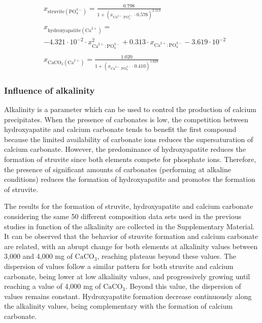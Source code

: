 \begin{refsection}[referencesCh3]
\begin{align}
&x_{\text{struvite} \left(\text{PO}_{4}^{3-}\right) }= \frac{0.798}{1+\left(x_{\text{Ca}^{2+}:\text{PO}_{4}^{3-}} \cdot 0.576\right)^{2.113}} \label{eq:sigmoidal_Ca_StrYield} \\
\nonumber \\
& x_{\text{hydroxyapatite} \left(\text{Ca}^{2+}\right)} = \label{eq:sigmoidal_Ca_HAP} \\
& -4.321 \cdot 10^{-2} \cdot x_{\text{Ca}^{2+}:\text{PO}_{4}^{3-}}^{2} + 0.313 \cdot x_{\text{Ca}^{2+}:\text{PO}_{4}^{3-}} - 3.619 \cdot 10^{-2} \nonumber 
\\
\nonumber \\
&  x_{\text{CaCO}_{3} \left(\text{Ca}^{2+}\right)} = \frac{1.020}{1+\left(x_{\text{Ca}^{2+}:\text{PO}_{4}^{3-}} \cdot 0.410 \right)^{1.029}} \label{eq:sigmoidal_CaCaCO3}
\end{align}

\subsubsection{Influence of alkalinity}
Alkalinity is a parameter which can be used to control the production of calcium precipitates. When the presence of carbonates is low, the competition between hydroxyapatite and calcium carbonate tends to benefit the first compound because the limited availability of carbonate ions reduces the supersaturation of calcium carbonate. However, the predominance of hydroxyapatite reduces the formation of struvite since both elements compete for phosphate ions. Therefore, the presence of significant amounts of carbonates (performing at alkaline conditions) reduces the formation of hydroxyapatite and promotes the formation of struvite. 

The results for the formation of struvite, hydroxyapatite and calcium carbonate considering the same 50 different composition data sets used in the previous studies  in function of the alkalinity are collected in the Supplementary Material.
It can be observed that the behavior of struvite formation and calcium carbonate are related, with an abrupt change for both elements at alkalinity values between 3,000 and 4,000 mg of $\text{CaCO}_{3}$, reaching plateaus beyond these values. The dispersion of values follow a similar pattern for both struvite and calcium carbonate, being lower at low alkalinity values, and progressively growing until reaching a value of 4,000 mg of $\text{CaCO}_{3}$. Beyond this value, the dispersion of  values remains constant. Hydroxyapatite formation decrease continuously along the alkalinity values, being complementary with the formation of calcium carbonate.


\end{refsection}
